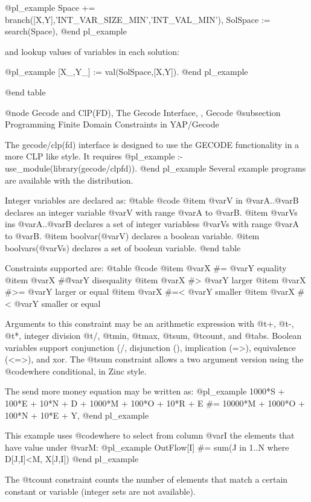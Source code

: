 @pl_example
    Space += branch([X,Y],'INT_VAR_SIZE_MIN','INT_VAL_MIN'),
    SolSpace := search(Space),
@end pl_example

and lookup values of variables in each solution:

@pl_example
    [X_,Y_] := val(SolSpace,[X,Y]).
@end pl_example

@end table

@node Gecode and ClP(FD), The Gecode Interface, , Gecode
@subsection Programming Finite Domain Constraints in YAP/Gecode

The gecode/clp(fd) interface is designed to use the GECODE functionality
in a more CLP like style. It requires
@pl_example
:- use_module(library(gecode/clpfd)).
@end pl_example
Several example programs are available with the distribution.

Integer variables are declared as:
@table @code
@item @var{V} in @var{A}..@var{B}
declares an integer variable @var{V} with range @var{A} to @var{B}.
@item @var{Vs} ins @var{A}..@var{B}
declares a set of integer variabless @var{Vs} with range @var{A} to @var{B}.
@item boolvar(@var{V})
declares a  boolean variable.
@item boolvars(@var{Vs})
declares a set of  boolean variable.
@end table


Constraints supported are:
@table @code
@item @var{X} #= @var{Y}
equality
@item @var{X} #\= @var{Y}
disequality
@item @var{X} #> @var{Y}
larger
@item @var{X} #>= @var{Y}
larger or equal
@item @var{X} #=< @var{Y}
smaller
@item @var{X} #< @var{Y}
smaller or equal

Arguments to this constraint may be an arithmetic expression with @t{+},
@t{-}, @t{*}, integer division @t{/}, @t{min}, @t{max}, @t{sum},
@t{count}, and
@t{abs}. Boolean variables support conjunction (/\), disjunction (\/),
implication (=>), equivalence (<=>), and xor. The @t{sum} constraint allows  a two argument version using the
@code{where} conditional, in Zinc style. 

The send more money equation may be written as:
@pl_example
          1000*S + 100*E + 10*N + D +
          1000*M + 100*O + 10*R + E #=
10000*M + 1000*O + 100*N + 10*E + Y,
@end pl_example

This example uses @code{where} to select from
column @var{I} the elements that have value under @var{M}:
@pl_example
OutFlow[I] #= sum(J in 1..N where D[J,I]<M, X[J,I])
@end pl_example

The @t{count} constraint counts the number of elements that match a
certain constant or variable (integer sets are not available).

